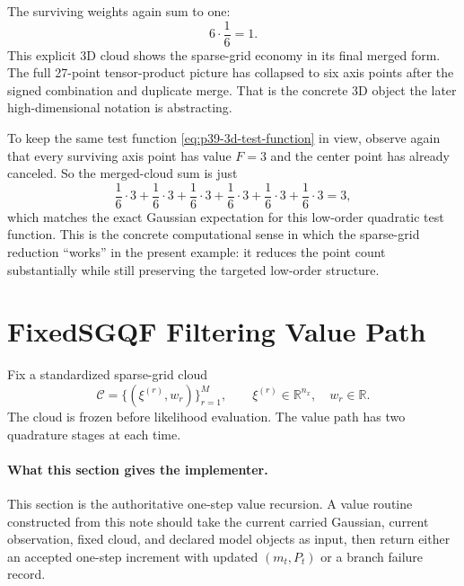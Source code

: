\documentclass[11pt]{article}
\numberwithin{equation}{section}
\newcommand{\R}{\mathbb R}
\begin{document}
The surviving weights again sum to one:
\begin{equation}
  6\cdot \frac16 = 1.
  \label{eq:p38-3d-weight-total}
\end{equation}
This explicit 3D cloud shows the sparse-grid economy in its final merged form.
The full 27-point tensor-product picture has collapsed to six axis points after
the signed combination and duplicate merge.  That is the concrete 3D object the
later high-dimensional notation is abstracting.

To keep the same test function \eqref{eq:p39-3d-test-function} in view, observe
again that every surviving axis point has value \(F=3\) and the center point has
already canceled.  So the merged-cloud sum is just
\begin{equation}
  \frac16\cdot 3 + \frac16\cdot 3 + \frac16\cdot 3 + \frac16\cdot 3 +
  \frac16\cdot 3 + \frac16\cdot 3 = 3,
  \label{eq:p39-3d-toy-cloud-sum}
\end{equation}
which matches the exact Gaussian expectation for this low-order quadratic test
function.  This is the concrete computational sense in which the sparse-grid
reduction ``works'' in the present example: it reduces the point count
substantially while still preserving the targeted low-order structure.

\section{FixedSGQF Filtering Value Path}
\label{sec:p31-value-path}

Fix a standardized sparse-grid cloud
\begin{equation}
  \mathcal C=\{(\xi^{(r)},w_r)\}_{r=1}^M,
  \qquad
  \xi^{(r)}\in\R^{n_x},
  \quad
  w_r\in\R.
  \label{eq:p31-cloud-for-filter}
\end{equation}
The cloud is frozen before likelihood evaluation.  The value path has two
quadrature stages at each time.

\paragraph{What this section gives the implementer.}
This section is the authoritative one-step value recursion.  A value routine
constructed from this note should take the current carried Gaussian,
current observation, fixed cloud, and declared model objects as input, then
return either an accepted one-step increment with updated \((m_t,P_t)\) or a
branch failure record.
\end{document}
